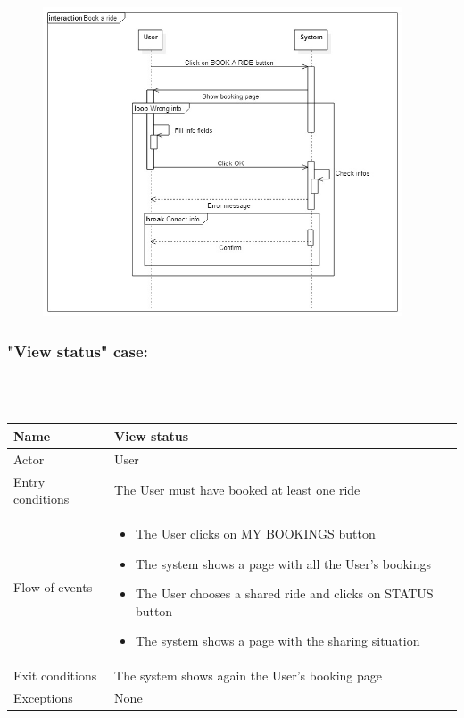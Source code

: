 \newpage

\begin{figure}[h!]
	\centering
	\includegraphics[width=0.95\textwidth]{"myTaxiServiceImg/SequenceDiagram/Book a ride"}
\end{figure}


\newpage
\subsubsection{"View status" case:}
\hfill \\
\\
\begin{tabular}{|p{3cm}|p{10cm}|}
\hline
Name & View status\\
\hline
Actor & User\\
\hline
Entry conditions & The User must have booked at least one ride\\
\hline
Flow of events &
	\begin{itemize}
			\item The User clicks on MY BOOKINGS button
			\item The system shows a page with all the User's bookings
			\item The User chooses a shared ride and clicks on STATUS button
			\item The system shows a page with the sharing situation
	\end{itemize}\\
\hline
Exit conditions & The system shows again the User's booking page\\
\hline
Exceptions & None\\
\hline
\end {tabular}

